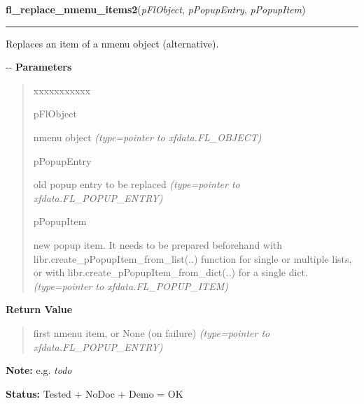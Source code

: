     \label{xformslib:flnmenu:fl_replace_nmenu_items2}

    \vspace{0.5ex}

\hspace{.8\funcindent}\begin{boxedminipage}{\funcwidth}

    \raggedright \textbf{fl\_replace\_nmenu\_items2}(\textit{pFlObject}, \textit{pPopupEntry}, \textit{pPopupItem})

    \vspace{-1.5ex}

    \rule{\textwidth}{0.5\fboxrule}
\setlength{\parskip}{2ex}

Replaces an item of a nmenu object (alternative).

-{}-
\setlength{\parskip}{1ex}
      \textbf{Parameters}
      \vspace{-1ex}

      \begin{quote}
        \begin{Ventry}{xxxxxxxxxxx}

          \item[pFlObject]


nmenu object
            {\it (type=pointer to xfdata.FL\_OBJECT)}

          \item[pPopupEntry]


old popup entry to be replaced
            {\it (type=pointer to xfdata.FL\_POPUP\_ENTRY)}

          \item[pPopupItem]


new popup item. It needs to be prepared beforehand with
libr.create\_pPopupItem\_from\_list(..) function for single or multiple
lists, or with libr.create\_pPopupItem\_from\_dict(..) for a single dict.
            {\it (type=pointer to xfdata.FL\_POPUP\_ITEM)}

        \end{Ventry}

      \end{quote}

      \textbf{Return Value}
    \vspace{-1ex}

      \begin{quote}

first nmenu item, or None (on failure)
      {\it (type=pointer to xfdata.FL\_POPUP\_ENTRY)}

      \end{quote}

\textbf{Note:} 
e.g. \emph{todo}


\textbf{Status:} 
Tested + NoDoc + Demo = OK


    \end{boxedminipage}

